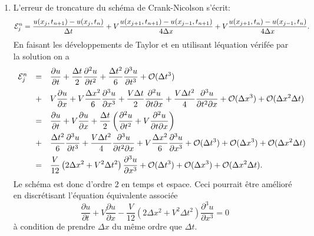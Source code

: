 \documentclass[12pt,a4paper]{article}
\begin{document}
\begin{enumerate}
$$$$
ce qui montre que l'\'equation \'equivalente associ\'ee est bien
$$
\frac{\partial u}{\partial t}+V \frac{\partial u}{\partial x} - \frac{V \Delta x^2}{6}\left(1-V^2\frac{\Delta t^2}{\Delta x^2}\right) \frac{\partial^3 u}{\partial x^3}=0
$$
En discr\'etisant maintenant celle-ci, on obtiendra une erreur de
troncature en ${\cal O} (\Delta t^3)
+{\cal O} (\Delta x^3) +  {\cal O} (\Delta x^2\Delta t)$, d'o\`u on
voit que la pr\'ecision sera amelior\'ee seulement si on prend $\Delta
x$ du m\^eme ordre que $\Delta t$. Dans ce cas, le sch\'ema
r\'esultant sera d'ordre $3$.
\item L'erreur de troncature du sch\'ema de Crank-Nicolson s'\'ecrit:
$$
{\cal E}^n_j=\frac{u(x_{j},t_{n+1})-u(x_j,t_n)}{\Delta
  t}+V\frac{u(x_{j+1},t_{n+1})-u(x_{j-1},t_{n+1})}{4\Delta
  x} + V\frac{u(x_{j+1},t_{n})-u(x_{j-1},t_{n})}{4\Delta
  x} .
$$
En faisant les d\'eveloppements de Taylor et en utilisant l\'equation
v\'erif\'ee par la solution on a
$$
\begin{array}{lcl}
{\cal E}^n_j &=& \displaystyle\frac{\partial u}{\partial t}+\frac{\Delta
  t}{2}\frac{\partial^2 u}{\partial t^2} + \frac{\Delta
  t^2}{6}\frac{\partial^3 u}{\partial t^3} + {\cal O} (\Delta t^3) \\[2ex]
& + & \displaystyle V\frac{\partial u}{\partial x}+V\frac{\Delta
  x^2}{6}\frac{\partial^3 u}{\partial x^3}+ \frac{V\Delta
  t}{2}\frac{\partial^2 u}{\partial t\partial x}+\frac{V\Delta
  t^2}{4}\frac{\partial^3 u}{\partial t^2\partial x}+{\cal O} (\Delta
x^3)+{\cal O} (\Delta x^2\Delta t)\\[2ex]
& = & \displaystyle \frac{\partial u}{\partial t}+V\frac{\partial
  u}{\partial x}+\frac{\Delta t}{2}\left(\frac{\partial^2 u}{\partial
    t^2} +V \frac{\partial^2 u}{\partial t\partial x}\right) \\[2ex]
&+&\displaystyle \frac{\Delta
t^2}{6}\frac{\partial^3 u}{\partial t^3} + \frac{V \Delta
t^2}{4} \frac{\partial^3 u}{\partial t^2\partial x}+V\frac{\Delta
  x^2}{6}\frac{\partial^3 u}{\partial x^3} + {\cal O} (\Delta
t^3)+{\cal O} (\Delta x^3)+{\cal O} (\Delta x^2\Delta t)\\[2ex]
& = & \displaystyle\frac{V}{12}\left(2\Delta x^2+V^2\Delta t^2\right)
\frac{\partial^3 u}{\partial x^3} + {\cal O} (\Delta
t^3)+{\cal O} (\Delta x^3)+{\cal O} (\Delta x^2\Delta t).
\end{array} 
$$
Le sch\'ema est donc d'ordre $2$ en temps et espace. Ceci pourrait
\^etre am\'elior\'e en discr\'etisant l'\'equation \'equivalente
associ\'ee
$$
\frac{\partial u}{\partial t}+V \frac{\partial u}{\partial x} -\displaystyle\frac{V}{12}\left(2\Delta x^2+V^2\Delta t^2\right)
\frac{\partial^3 u}{\partial x^3}=0
$$
\`a condition de prendre $\Delta x$ du m\^eme ordre que $\Delta t$.


\end{enumerate}
\end{document}
